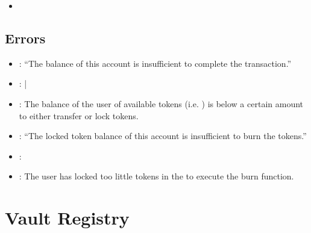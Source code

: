 \documentclass[a4paper,10pt,english]{sphinxmanual}
\begin{document}
\begin{itemize}
\item {} 
{\hyperref[\detokenize{spec/treasury:burn}]{}}

\end{itemize}


\section{Errors}
\label{\detokenize{spec/treasury:errors}}
\begin{itemize}
\item {} 
: “The balance of this account is insufficient to complete the transaction.”

\item {} 
: {\hyperref[\detokenize{spec/treasury:transfer}]{}} | {\hyperref[\detokenize{spec/treasury:lock}]{}}

\item {} 
: The balance of the user of available tokens (i.e. ) is below a certain amount to either transfer or lock tokens.

\end{itemize}

\begin{itemize}
\item {} 
: “The locked token balance of this account is insufficient to burn the tokens.”

\item {} 
: {\hyperref[\detokenize{spec/treasury:burn}]{}}

\item {} 
: The user has locked too little tokens in the  to execute the burn function.

\end{itemize}


\chapter{Vault Registry}
\label{\detokenize{spec/vault-registry:vault-registry}}\label{\detokenize{spec/vault-registry:id1}}\label{\detokenize{spec/vault-registry::doc}}
\end{document}
